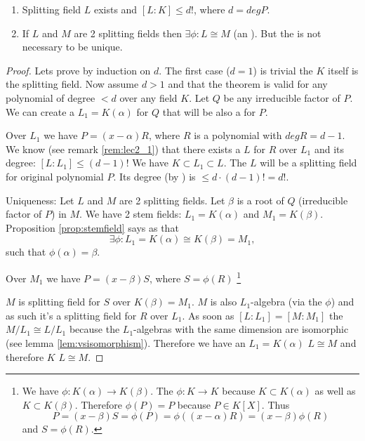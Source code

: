 \begin{theorem}
  \begin{enumerate}
    \item Splitting field $L$ exists and $\left[L:K\right] \le d!$,
      where $d = deg P$.
    \item If $L$ and $M$ are 2 splitting fields then
      $\exists \phi: L \cong M$ (an ). But
      the  is not necessary to be unique.
  \end{enumerate}
  \begin{proof}
    Lets prove by induction on $d$. The first case ($d = 1$) is
    trivial the $K$ itself is the splitting field. Now assume $d > 1$
    and that the theorem is valid for any polynomial of degree $< d$
    over any field $K$. Let $Q$ be any irreducible factor of $P$. We
    can create a  $L_1 = K\left(\alpha\right)$
    for $Q$ that will be also a  for $P$.

    Over $L_1$ we have $P = (x - \alpha) R$, where $R$ is a polynomial
    with $deg R = d - 1$. We know (see remark \ref{rem:lec2_1}) that
    there exists a  $L$ for $R$ over $L_1$
    and its degree:
    \(
    \left[L:L_1\right] \le (d-1)!
    \)
    We have $K \subset L_1 \subset L$. The $L$ will be a splitting
    field for original polynomial $P$. Its degree (by
    ) is $ \le d \cdot (d-1)! = d!$.

    Uniqueness: Let $L$ and $M$ are 2 splitting fields. Let $\beta$ is
    a root of $Q$ (irreducible factor of $P$) in $M$.
    We have 2 stem fields: $L_1 = K\left(\alpha\right)$ and
    $M_1 = K\left(\beta\right)$. Proposition \ref{prop:stemfield} says
    as that
    \[
    \exists \phi: L_1 = K\left(\alpha\right) \cong
    K\left(\beta\right) = M_1, 
    \]
    such that $\phi(\alpha) = \beta$.

    Over $M_1$ we have $P = (x - \beta) S$, where
    $S = \phi\left(R\right)$
    \footnote{
      We have $\phi: K\left(\alpha\right) \to
      K\left(\beta\right)$. The $\phi: K \to K$ because
      $K \subset K\left(\alpha\right)$ as well as
      $K \subset K\left(\beta\right)$. Therefore
      $\phi\left(P\right) = P$ because $P \in K\left[X\right]$.
      Thus
      \[
      P = (x - \beta) S = \phi\left(P\right) =
      \phi\left((x - \alpha) R\right) =
      (x - \beta) \phi\left(R\right)
      \]
      and $S = \phi\left(R\right)$.
    }

    $M$ is splitting field for $S$ over
    $K\left(\beta\right) = M_1$. $M$ is also $L_1$-algebra (via the
     $\phi$) and as such it's a splitting
    field for $R$ over $L_1$. As soon as
    $\left[L:L_1\right] = \left[M:M_1\right]$ the $M/L_1 \cong L/L_1$
    because the $L_1$-algebras with the same dimension are isomorphic (see lemma
    \ref{lem:vsisomorphism}). Therefore we have an
    $L_1 = K\left(\alpha\right)$  $L \cong M$
    and therefore $K$  $L \cong M$.    
  \end{proof}
  \label{thm:lec2_1}
\end{theorem}

